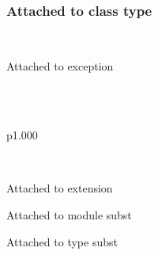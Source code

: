 \label{module-Labels-class-c}\\
\label{module-Labels-class-type-cs}\begin{ocamlindent}\subsubsection{Attached to class type\label{L7}}%
\end{ocamlindent}%
\\
\label{module-Labels-exception-E}\begin{ocamlindent}Attached to exception\end{ocamlindent}%
\medbreak
\label{module-Labels-type-x}\\
\label{module-Labels-extension-decl-X}\\
\begin{ocamltabular}{p{1.000\textwidth}}\label{module-Labels-extension-X}\\
\end{ocamltabular}%
\\
\begin{ocamlindent}Attached to extension\end{ocamlindent}%
\medbreak
\label{module-Labels-module-S}\begin{ocamlindent}Attached to module subst\end{ocamlindent}%
\medbreak
\label{module-Labels-type-s}\begin{ocamlindent}Attached to type subst\end{ocamlindent}%
\medbreak
\label{module-Labels-type-u}\\
